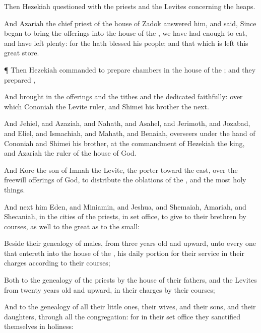 {Then
Hezekiah
questioned with the
priests and the
Levites concerning the
heaps.

And
Azariah the
chief
priest of the
house of
Zadok
answered him, and
said, Since
{}
began to
bring the
offerings into the
house of the
{}, we have had
enough to
eat, and have
left
plenty: for the
{} hath
blessed his
people; and that which is
left
{} this great
store.


\par }{\PP {}¶ Then
Hezekiah
commanded to
prepare
chambers in the
house of the
{}; and they
prepared
{},

And brought
in the
offerings and the
tithes and the
dedicated
{}
faithfully: over which
Cononiah the
Levite
{}
ruler, and
Shimei his
brother
{} the
next.

And
Jehiel, and
Azaziah, and
Nahath, and
Asahel, and
Jerimoth, and
Jozabad, and
Eliel, and
Ismachiah, and
Mahath, and
Benaiah,
{}
overseers under the
hand of
Cononiah and
Shimei his
brother, at the
commandment of
Hezekiah the
king, and
Azariah the
ruler of the
house of
God.

And
Kore the
son of
Imnah the
Levite, the
porter toward the
east,
{} over the freewill
offerings of
God, to
distribute the
oblations of the
{}, and the
most holy
things.

And next him
{}
Eden, and
Miniamin, and
Jeshua, and
Shemaiah,
Amariah, and
Shecaniah, in the
cities of the
priests, in
{} set
office, to
give to their
brethren
by
courses, as well to the
great as to the
small:

Beside their
genealogy of
males, from
three
years
old and
upward,
{} unto every one that
entereth into the
house of the
{}, his
daily
portion for their
service in their
charges according to their
courses;

Both to the
genealogy of the
priests by the
house of their
fathers, and the
Levites from
twenty
years
old and
upward, in their
charges by their
courses;

And to the
genealogy of all their little
ones, their
wives, and their
sons, and their
daughters, through all the
congregation: for in their set
office they
sanctified themselves in
holiness:

}
